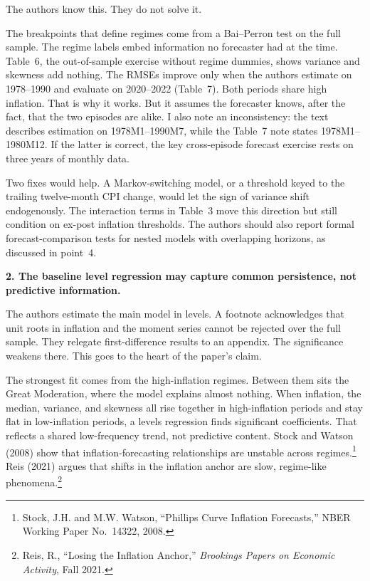 \documentclass[11pt, a4paper]{article}
\begin{document}
The authors know this. They do not solve it.

The breakpoints that define regimes come from a Bai--Perron test on the full sample. The regime labels embed information no forecaster had at the time. Table~6, the out-of-sample exercise without regime dummies, shows variance and skewness add nothing. The RMSEs improve only when the authors estimate on 1978--1990 and evaluate on 2020--2022 (Table~7). Both periods share high inflation. That is why it works. But it assumes the forecaster knows, after the fact, that the two episodes are alike. I also note an inconsistency: the text describes estimation on 1978M1--1990M7, while the Table~7 note states 1978M1--1980M12. If the latter is correct, the key cross-episode forecast exercise rests on three years of monthly data.

Two fixes would help. A Markov-switching model, or a threshold keyed to the trailing twelve-month CPI change, would let the sign of variance shift endogenously. The interaction terms in Table~3 move this direction but still condition on ex-post inflation thresholds. The authors should also report formal forecast-comparison tests for nested models with overlapping horizons, as discussed in point~4.

\textbf{2. The baseline level regression may capture common persistence, not predictive information.}

The authors estimate the main model in levels. A footnote acknowledges that unit roots in inflation and the moment series cannot be rejected over the full sample. They relegate first-difference results to an appendix. The significance weakens there. This goes to the heart of the paper's claim.

The strongest fit comes from the high-inflation regimes. Between them sits the Great Moderation, where the model explains almost nothing. When inflation, the median, variance, and skewness all rise together in high-inflation periods and stay flat in low-inflation periods, a levels regression finds significant coefficients. That reflects a shared low-frequency trend, not predictive content. Stock and Watson (2008) show that inflation-forecasting relationships are unstable across regimes.\footnote{Stock, J.H. and M.W. Watson, ``Phillips Curve Inflation Forecasts,'' NBER Working Paper No.~14322, 2008.} Reis (2021) argues that shifts in the inflation anchor are slow, regime-like phenomena.\footnote{Reis, R., ``Losing the Inflation Anchor,'' \textit{Brookings Papers on Economic Activity}, Fall 2021.}
\end{document}
